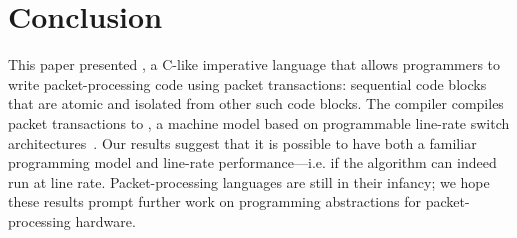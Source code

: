\section{Conclusion}
\label{s:conclusion}

This paper presented \pktlanguage, a C-like imperative language that allows
programmers to write packet-processing code using packet transactions:
sequential code blocks that are atomic and isolated from other such code
blocks. The \pktlanguage compiler compiles packet transactions to \absmachine,
a machine model based on programmable line-rate switch
architectures~\cite{flexpipe, xpliant, rmt}. Our results suggest that it is
possible to have both a familiar programming model and line-rate
performance---i.e. if the algorithm can indeed run at line rate.
Packet-processing languages are still in their infancy; we hope these results
prompt further work on programming abstractions for packet-processing hardware.
